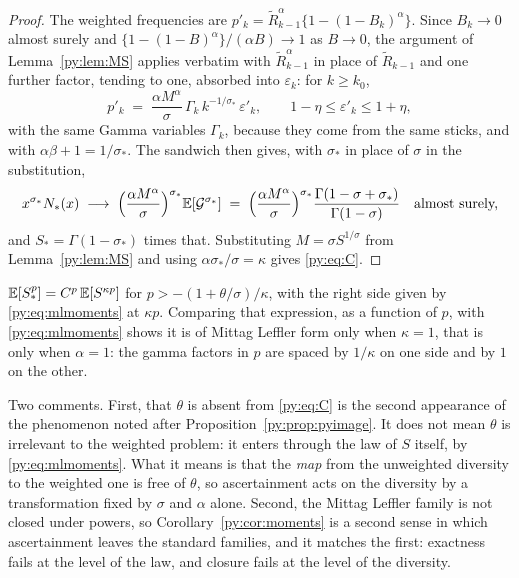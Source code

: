 \begin{proof}
The weighted frequencies are
$p'_k = \widetilde R_{k-1}^{\alpha}\{1-(1-B_k)^{\alpha}\}$. Since $B_k \to 0$ almost surely and
$\{1-(1-B)^{\alpha}\}/(\alpha B) \to 1$ as $B \to 0$, the argument of Lemma~\ref{py:lem:MS} applies
verbatim with $\widetilde R_{k-1}^{\alpha}$ in place of $\widetilde R_{k-1}$ and one further
factor, tending to one, absorbed into $\varepsilon_k$: for $k \ge k_0$,
\[
p'_k \;=\; \frac{\alpha M^{\alpha}}{\sigma}\,\Gamma_k\,k^{-1/\sigma_*}\,\varepsilon'_k,
\qquad 1-\eta \le \varepsilon'_k \le 1+\eta,
\]
with the same Gamma variables $\Gamma_k$, because they come from the same sticks, and with
$\alpha\beta+1 = 1/\sigma_*$. The sandwich then gives, with $\sigma_*$ in place of $\sigma$ in the
substitution,
\[
x^{\sigma_*}N_*(x) \;\longrightarrow\;
\Big(\frac{\alpha M^{\alpha}}{\sigma}\Big)^{\sigma_*}
\mathbb{E}[\mathcal{G}^{\sigma_*}]
\;=\;
\Big(\frac{\alpha M^{\alpha}}{\sigma}\Big)^{\sigma_*}
\frac{\Gamma(1-\sigma+\sigma_*)}{\Gamma(1-\sigma)}
\quad\text{almost surely,}
\]
and $S_* = \Gamma(1-\sigma_*)$ times that. Substituting $M = \sigma S^{1/\sigma}$ from
Lemma~\ref{py:lem:MS} and using $\alpha\sigma_*/\sigma = \kappa$ gives \eqref{py:eq:C}.
\end{proof}

\begin{corollary}
\label{py:cor:moments}
$\mathbb{E}[S_*^{p}] = C^{p}\,\mathbb{E}[S^{\kappa p}]$ for $p > -(1+\theta/\sigma)/\kappa$, with the right side given by
\eqref{py:eq:mlmoments} at $\kappa p$. Comparing that expression, as a function of $p$, with \eqref{py:eq:mlmoments} shows it is of
Mittag Leffler form only when $\kappa = 1$, that is only when $\alpha = 1$: the gamma factors in
$p$ are spaced by $1/\kappa$ on one side and by $1$ on the other.
\end{corollary}

Two comments. First, that $\theta$ is absent from \eqref{py:eq:C} is the second appearance of the
phenomenon noted after Proposition~\ref{py:prop:pyimage}. It does not mean $\theta$ is irrelevant to
the weighted problem: it enters through the law of $S$ itself, by \eqref{py:eq:mlmoments}. What it
means is that the \emph{map} from the unweighted diversity to the weighted one is free of $\theta$,
so ascertainment acts on the diversity by a transformation fixed by $\sigma$ and $\alpha$ alone.
Second, the Mittag Leffler family is not closed under powers, so Corollary~\ref{py:cor:moments} is a
second sense in which ascertainment leaves the standard families, and it matches the first:
exactness fails at the level of the law, and closure fails at the level of the diversity.

